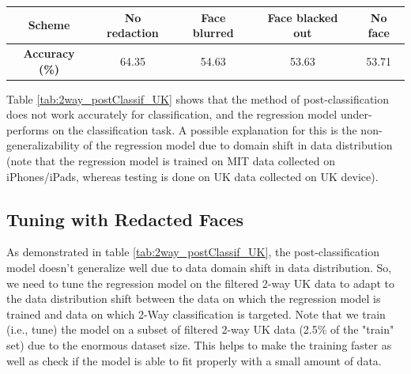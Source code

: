 \begin{table}[h]
\begin{tabular}{|c||c|c|c|c|}
      \hline
      \textbf{Scheme} & No redaction & Face blurred & Face blacked out & No face \\
      \hline
      \textbf{Accuracy (\%)} & 64.35 & 54.63 & 53.63 & 53.71 \\
      \hline
    \end{tabular}  
\end{table}

Table \ref{tab:2way_postClassif_UK} shows that the method of post-classification does not work accurately for classification, and the regression model under-performs on the classification task. A possible explanation for this is the non-generalizability of the regression model due to domain shift in data distribution (note that the regression model is trained on MIT data collected on iPhones/iPads, whereas testing is done on UK data collected on UK device).


\subsection{Tuning with Redacted Faces}
As demonstrated in table \ref{tab:2way_postClassif_UK}, the post-classification model doesn't generalize well due to data domain shift in data distribution. So, we need to tune the regression model on the filtered 2-way UK data to adapt to the data distribution shift between the data on which the regression model is trained and data on which 2-Way classification is targeted. Note that we train (i.e., tune) the model on a subset of filtered 2-way UK data (2.5\% of the "train" set) due to the enormous dataset size. This helps to make the training faster as well as check if the model is able to fit properly with a small amount of data.

